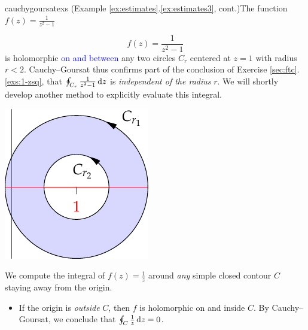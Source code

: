 \begin{examples}{}{cauchygoursatexs}
	\exstart (Example \ref*{ex:estimates}.\ref{ex:estimates3}, cont.)\lstsp The function $f(z)=\frac 1{z^2-1}$
	\begin{enumerate}\setcounter{enumi}{1}
	  \begin{minipage}[t]{0.73\linewidth}\vspace{-15pt}
			\item[]
			\[
				f(z)=\frac 1{z^2-1}
			\]
			is holomorphic \textcolor{blue}{on and between} any two circles $C_{r}$ centered at $z=1$ with radius $r<2$. Cauchy--Goursat thus confirms part of the conclusion of Exercise \ref*{sec:ftc}.\ref{exs:1-zsq}, that $\oint_{C_r}\frac 1{z^2-1}\,{\mathrm{d} z}$ is \emph{independent of the radius} $r$.\smallbreak
			We will shortly develop another method to explicitly evaluate this integral.
		\end{minipage}
		\hfill
		\begin{minipage}[t]{0.26\linewidth}\vspace{-18pt}
		  \flushright\includegraphics[scale=0.95]{cauchygoursat2}
		\end{minipage}

	  \item We compute the integral of $f(z)=\frac 1z$ around \emph{any} simple closed contour $C$ staying away from the origin.
	  \begin{itemize}
	    \item If the origin is \emph{outside} $C$, then $f$ is holomorphic on and inside $C$. By Cauchy--Goursat, we conclude that $\oint_C\frac 1z\,{\mathrm{d} z}=0$.
	    

\end{itemize}
\end{enumerate}
\end{examples}
